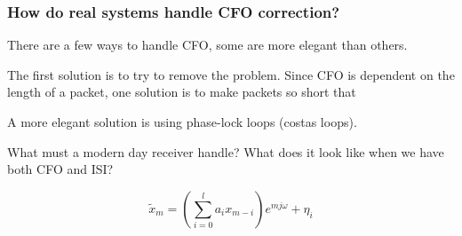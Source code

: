 \subsubsection{How do real systems handle CFO correction?}

There are a few ways to handle CFO, some are more elegant than others. 

The first solution is to try to remove the problem.  Since CFO is dependent on the length of a packet, one solution is to make packets so short that 

A more elegant solution is using phase-lock loops (costas loops).

What must a modern day receiver handle?  What does it look like when we have both CFO and ISI?

$$\tilde{x}_m = (\sum_{i=0}^l a_i x_{m-i})e^{mj\omega} + \eta_i$$


